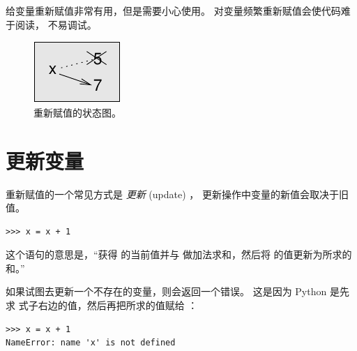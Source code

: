 给变量重新赋值非常有用，但是需要小心使用。 对变量频繁重新赋值会使代码难于阅读，
不易调试。

\begin{figure}
\centerline
{\includegraphics[scale=0.99]{../source/figs/assign2.pdf}}
\caption {重新赋值的状态图。}
\label{fig.assign2}
\end{figure}


\section{更新变量}
\label{update}

  
  


重新赋值的一个常见方式是 {\em 更新} (update) ， 更新操作中变量的新值会取决于旧值。


\begin{lstlisting}
>>> x = x + 1
\end{lstlisting}

%

这个语句的意思是，``获得  的当前值并与  做加法求和，然后将  的值更新为所求的和。''


如果试图去更新一个不存在的变量，则会返回一个错误。 这是因为 Python 是先求
式子右边的值，然后再把所求的值赋给 ：

\begin{lstlisting}
>>> x = x + 1
NameError: name 'x' is not defined
\end{lstlisting}

%


